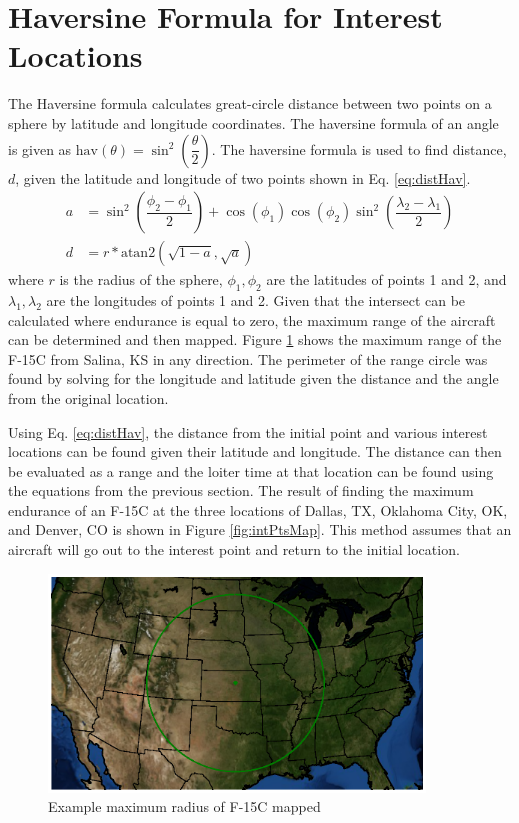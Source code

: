 \section{Haversine Formula for Interest Locations}
The Haversine formula calculates great-circle distance between two points on a sphere by latitude and longitude coordinates. The haversine formula of an angle is given as $\text{hav}(\theta) = \sin^2\left(\dfrac{\theta}{2}\right)$. The haversine formula is used to find distance, $d$, given the latitude and longitude of two points shown in Eq. \ref{eq:distHav}. 
\begin{equation}
\begin{aligned}
    a &= \sin^2\left(\dfrac{\phi_2-\phi_1}{2}\right)+\cos(\phi_1)\cos(\phi_2)\sin^2\left(\dfrac{\lambda_2-\lambda_1}{2}\right)
    \label{eq:distHav}\\
    d &= r*\text{atan2}(\sqrt{1-a},\sqrt{a})
\end{aligned}
\end{equation}
where $r$ is the radius of the sphere, $\phi_1,\phi_2$ are the latitudes of points 1 and 2, and $\lambda_1,\lambda_2$ are the longitudes of points 1 and 2. Given that the intersect can be calculated where endurance is equal to zero, the maximum range of the aircraft can be determined and then mapped. Figure \ref{fig:maxRadius} shows the maximum range of the F-15C from Salina, KS in any direction. The perimeter of the range circle was found by solving for the longitude and latitude given the distance and the angle from the original location. \par
Using Eq. \ref{eq:distHav}, the distance from the initial point and various interest locations can be found given their latitude and longitude. The distance can then be evaluated as a range and the loiter time at that location can be found using the equations from the previous section. The result of finding the maximum endurance of an F-15C at the three locations of Dallas, TX, Oklahoma City, OK, and Denver, CO is shown in Figure \ref{fig:intPtsMap}. This method assumes that an aircraft will go out to the interest point and return to the initial location.
\begin{figure}
    \centering
    \includegraphics[width = 10cm]{Thesis/Method/RadiusEx.eps}
    \caption{Example maximum radius of F-15C mapped}
    \label{fig:maxRadius}
\end{figure}
